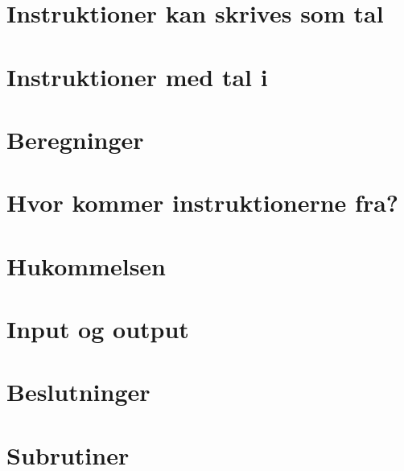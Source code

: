\documentclass[a4paper]{article}
\begin{document}
\newpage
\section{Instruktioner kan skrives som tal}

\section{Instruktioner med tal i}

\section{Beregninger}

\section{Hvor kommer instruktionerne fra?}

\section{Hukommelsen}

\section{Input og output}

\section{Beslutninger}

\section{Subrutiner}
\end{document}
